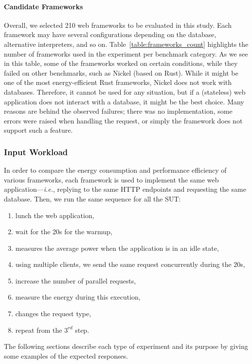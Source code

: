 \paragraph{Candidate Frameworks}

Overall, we selected 210 web frameworks to be evaluated in this study.
Each framework may have several configurations depending on the database, alternative interpreters, and so on.
Table~\ref{table:frameworks_count} highlights the number of frameworks used in the experiment per benchmark category.
As we see in this table, some of the frameworks worked on certain conditions, while they failed on other benchmarks, such as Nickel (based on Rust).
While it might be one of the most energy-efficient Rust frameworks, Nickel does not work with databases.
Therefore, it cannot be used for any situation, but if a (stateless) web application does not interact with a database, it might be the best choice.
Many reasons are behind the observed failures; there was no implementation, some errors were raised when handling the request, or simply the framework does not support such a feature.

\subsubsection{Input Workload}

In order to compare the energy consumption and performance efficiency of various frameworks, each framework is used to implement the same web application---\emph{i.e.}, replying to the same HTTP endpoints and requesting the same database. Then, we run the same sequence for all the SUT:
\begin{enumerate}
    \item lunch the web application,
    \item wait for the 20s for the warmup,
    \item measures the average power when the application is in an idle state,
    \item using multiple clients, we send the same request concurrently during the 20s,
    \item increase the number of parallel requests,
    \item measure the energy during this execution,
    \item changes the request type,
    \item repeat from the $3^{rd}$ step.
\end{enumerate}

The following sections describe each type of experiment and its purpose by giving some examples of the expected responses.

